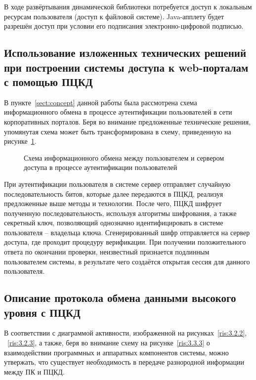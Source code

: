 В ходе развёртывания динамической библиотеки потребуется доступ к локальным
ресурсам пользователя (доступ к файловой системе). Java-апплету будет разрешён
доступ при условии его подписания электронно-цифровой подписью.~\cite{nikitin}

\subsection{Использование изложенных технических решений при построении системы доступа
к web-порталам с помощью ПЦКД}

В пункте~\ref{sect:concept} данной работы была рассмотрена схема
информационного обмена в процессе аутентификации пользователей в сети
корпоративных порталов.
Беря во внимание предложенные технические решения, упомянутая схема может быть
трансформирована в схему, приведенную на рисунке~\ref{ris:3.3.5}.
 
\begin{figure}[h!]
\center{\texttt{[image: 3-3-5]}}
\caption{Схема информационного обмена между пользователем и сервером доступа в
процессе аутентификации пользователей}
\label{ris:3.3.5}
\end{figure} 

При аутентификации пользователя в системе сервер отправляет случайную
последовательность битов, которые далее передаются в ПЦКД, реализуя предложенные
выше методы и технологии. После чего, ПЦКД шифрует полученную
последовательность, используя алгоритмы шифрования, а также секретный ключ, позволяющий однозначно
идентифицировать в системе пользователя – владельца ключа. Сгенерированный шифр
отправляется на сервер доступа, где проходит процедуру верификации. При
получении положительного ответа по окончании проверки, неизвестный признается
подлинным пользователем системы, в результате чего создаётся открытая сессия для
данного пользователя.~\cite{tex_asp}

\subsection{Описание протокола обмена данными высокого уровня с ПЦКД}

В соответствии с диаграммой активности, изображенной на
рисунках~\ref{ris:3.2.2}, ~\ref{ris:3.2.3}, а также, беря во
внимание схему на рисунке~\ref{ris:3.3.3} о взаимодействии программных и аппаратных компонентов
системы, можно утвержать, что существует необходимость в передаче разнородной
информации между ПК и ПЦКД.

